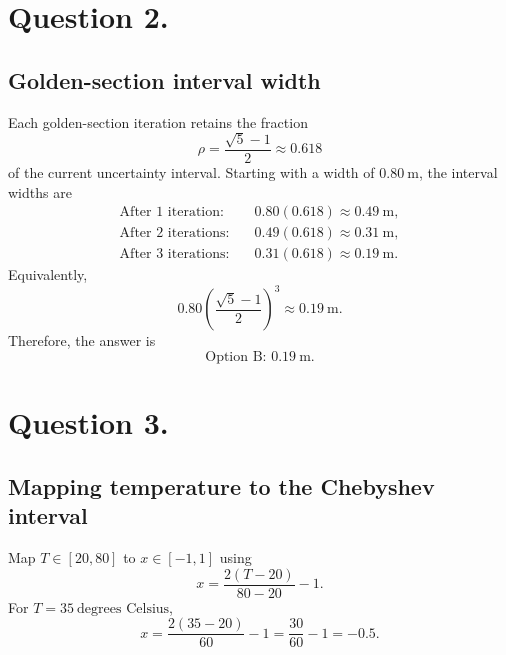 \documentclass[a4paper]{exam}
\begin{document}
\section*{Question 2.}

\subsection*{Golden-section interval width}

\begin{solution}
  Each golden-section iteration retains the fraction
  \[
    \rho=\frac{\sqrt{5}-1}{2}\approx 0.618
  \]
  of the current uncertainty interval. Starting with a width of
  \(0.80\ \mathrm{m}\), the interval widths are
  \[
    \begin{aligned}
      \text{After 1 iteration:}\quad &0.80(0.618)
        \approx 0.49\ \mathrm{m},\\
      \text{After 2 iterations:}\quad &0.49(0.618)
        \approx 0.31\ \mathrm{m},\\
      \text{After 3 iterations:}\quad &0.31(0.618)
        \approx 0.19\ \mathrm{m}.
    \end{aligned}
  \]
  Equivalently,
  \[
    0.80\left(\frac{\sqrt{5}-1}{2}\right)^3
      \approx 0.19\ \mathrm{m}.
  \]
  Therefore, the answer is
  \[
    \boxed{\text{Option B: }0.19\ \mathrm{m}}.
  \]
\end{solution}

\section*{Question 3.}

\subsection*{Mapping temperature to the Chebyshev interval}

\begin{solution}
  Map \(T\in[20,80]\) to \(x\in[-1,1]\) using
  \[
    x=\frac{2(T-20)}{80-20}-1.
  \]
  For \(T=35\ \text{degrees Celsius}\),
  \[
    x=\frac{2(35-20)}{60}-1
      =\frac{30}{60}-1
      =\boxed{-0.5}.
  \]
\end{solution}
\end{document}
